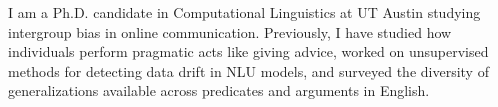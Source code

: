 I am a Ph.D. candidate in Computational Linguistics at UT Austin studying intergroup bias in online communication. Previously, I have studied how individuals perform pragmatic acts like giving advice, worked on unsupervised methods for detecting data drift in NLU models, and surveyed the diversity of generalizations available across predicates and arguments in English.
